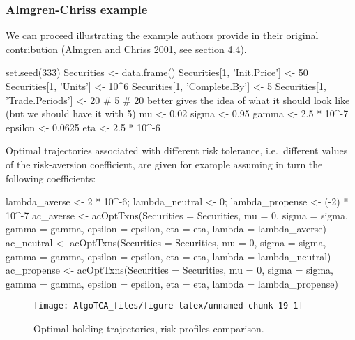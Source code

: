 \hypertarget{almgren-chriss-example}{%
\subsubsection{Almgren-Chriss example}\label{almgren-chriss-example}}

We can proceed illustrating the example authors provide in their
original contribution (Almgren and Chriss 2001, see section 4.4).

\begin{Schunk}
\begin{Sinput}
set.seed(333)
Securities <- data.frame()
Securities[1, 'Init.Price'] <- 50
Securities[1, 'Units'] <- 10^6
Securities[1, 'Complete.By'] <- 5
Securities[1, 'Trade.Periods'] <- 20 # 5 # 20 better gives the idea of what it should look like (but we should have it with 5)
mu <- 0.02
sigma <- 0.95
gamma <- 2.5 * 10^-7 
epsilon <- 0.0625
eta <- 2.5 * 10^-6 
\end{Sinput}
\end{Schunk}

Optimal trajectories associated with different risk tolerance,
i.e.~different values of the risk-aversion coefficient, are given for
example assuming in turn the following coefficients:

\begin{Schunk}
\begin{Sinput}
lambda_averse <- 2 * 10^-6; lambda_neutral <- 0; lambda_propense <- (-2) * 10^-7
ac_averse <- acOptTxns(Securities = Securities, mu = 0, sigma = sigma, 
                       gamma = gamma, epsilon = epsilon, eta = eta, 
                       lambda = lambda_averse)
ac_neutral <- acOptTxns(Securities = Securities, mu = 0, sigma = sigma, 
                        gamma = gamma, epsilon = epsilon, eta = eta, 
                        lambda = lambda_neutral)
ac_propense <- acOptTxns(Securities = Securities, mu = 0, sigma = sigma, 
                         gamma = gamma, epsilon = epsilon, eta = eta, 
                         lambda = lambda_propense)
\end{Sinput}
\end{Schunk}

\begin{Schunk}
\begin{figure}[ht]

{\centering \texttt{[image: AlgoTCA\_files/figure-latex/unnamed-chunk-19-1]} 

}

\caption[Optimal holding trajectories, risk profiles comparison]{Optimal holding trajectories, risk profiles comparison.}\label{fig:unnamed-chunk-19}
\end{figure}
\end{Schunk}

